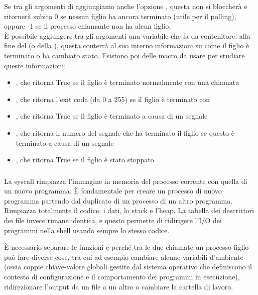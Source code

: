 \documentclass[11pt, a4paper, titlepage, oneside]{scrbook}
\begin{document}
Se tra gli argomenti di  aggiungiamo anche l'opzione , questa non si bloccherà e ritornerà subito 0 se nessun figlio ha ancora terminato (utile per il polling), oppure -1 se il processo chiamante non ha alcun figlio. \\
È possibile aggiungere tra gli argomenti una variabile  che fa da contenitore: alla fine del  (o della ), questa conterrà al suo interno informazioni su come il figlio è terminato o ha cambiato stato. Esistono poi delle macro da usare per studiare queste informazioni:
\begin{itemize}
    \item {}, che ritorna True se il figlio è terminato normalmente con una chiamata 
    \item {}, che ritorna l'exit code (da 0 a 255) se il figlio è terminato con 
    \item {}, che ritorna True se il figlio è terminato a causa di un segnale
    \item {}, che ritorna il numero del segnale che ha terminato il figlio se questo è terminato a causa di un segnale
    \item {}, che ritorna True se il figlio è stato stoppato
\end{itemize}

\subsubsection*{}

\begin{Definizione}
\label{def-exec}
La syscall  rimpiazza l'immagine in memoria del processo corrente con quella di un nuovo programma. È fondamentale per creare un processo di nuovo programma partendo dal duplicato di un processo di un altro programma. Rimpiazza totalmente il codice, i dati, lo stack e l'heap. La tabella dei descrittori dei file invece rimane identica, e questo permette di ridirigere l'I/O dei programmi nella shell usando sempre lo stesso codice.
\end{Definizione}

È necessario separare le funzioni  e  perché tra le due chiamate un processo figlio può fare diverse cose, tra cui ad esempio cambiare alcune variabili d'ambiente (ossia coppie chiave-valore globali gestite dal sistema operativo che definiscono il contesto di configurazione e il comportamento dei programmi in esecuzione), ridirezionare l'output da un file a un altro o cambiare la cartella di lavoro.
\end{document}
